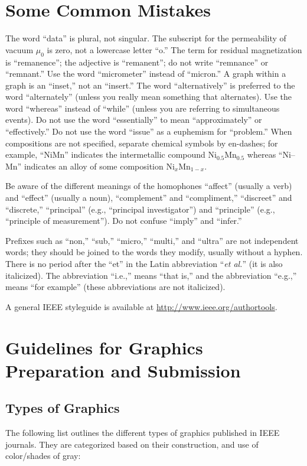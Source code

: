 \documentclass{ieeeaccess}
\begin{document}
\section{Some Common Mistakes}
The word ``data'' is plural, not singular. The subscript for the
permeability of vacuum $\mu _{0}$ is zero, not a lowercase letter
``o.'' The term for residual magnetization is ``remanence''; the adjective
is ``remanent''; do not write ``remnance'' or ``remnant.'' Use the word
``micrometer'' instead of ``micron.'' A graph within a graph is an
``inset,'' not an ``insert.'' The word ``alternatively'' is preferred to the
word ``alternately'' (unless you really mean something that alternates). Use
the word ``whereas'' instead of ``while'' (unless you are referring to
simultaneous events). Do not use the word ``essentially'' to mean
``approximately'' or ``effectively.'' Do not use the word ``issue'' as a
euphemism for ``problem.'' When compositions are not specified, separate
chemical symbols by en-dashes; for example, ``NiMn'' indicates the
intermetallic compound Ni$_{0.5}$Mn$_{0.5}$ whereas
``Ni--Mn'' indicates an alloy of some composition
Ni$_{x}$Mn$_{1-x}$.

Be aware of the different meanings of the homophones ``affect'' (usually a
verb) and ``effect'' (usually a noun), ``complement'' and ``compliment,''
``discreet'' and ``discrete,'' ``principal'' (e.g., ``principal
investigator'') and ``principle'' (e.g., ``principle of measurement''). Do
not confuse ``imply'' and ``infer.''

Prefixes such as ``non,'' ``sub,'' ``micro,'' ``multi,'' and ``ultra'' are
not independent words; they should be joined to the words they modify,
usually without a hyphen. There is no period after the ``et'' in the Latin
abbreviation ``\emph{et al.}'' (it is also italicized). The abbreviation ``i.e.,'' means
``that is,'' and the abbreviation ``e.g.,'' means ``for example'' (these
abbreviations are not italicized).

A general IEEE styleguide is available at \break
\underline{http://www.ieee.org/authortools}.

\section{Guidelines for Graphics Preparation and Submission}
\label{sec:guidelines}

\subsection{Types of Graphics}
The following list outlines the different types of graphics published in
IEEE journals. They are categorized based on their construction, and use of
color/shades of gray:
\end{document}
